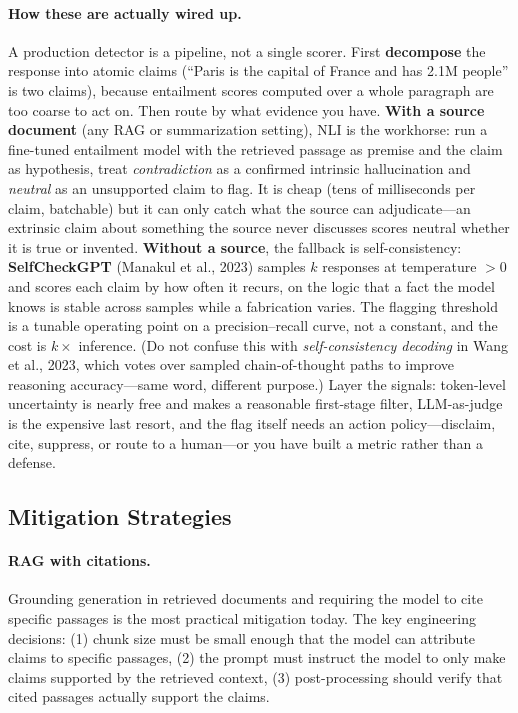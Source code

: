 \paragraph{How these are actually wired up.}
A production detector is a pipeline, not a single scorer.  First
\textbf{decompose} the response into atomic claims (``Paris is the capital of
France and has 2.1M people'' is two claims), because entailment scores computed
over a whole paragraph are too coarse to act on.  Then route by what evidence
you have.  \textbf{With a source document} (any RAG or summarization setting),
NLI is the workhorse: run a fine-tuned entailment model with the retrieved
passage as premise and the claim as hypothesis, treat \emph{contradiction} as a
confirmed intrinsic hallucination and \emph{neutral} as an unsupported claim to
flag.  It is cheap (tens of milliseconds per claim, batchable) but it can only
catch what the source can adjudicate---an extrinsic claim about something the
source never discusses scores neutral whether it is true or invented.
\textbf{Without a source}, the fallback is self-consistency:
\textbf{SelfCheckGPT} (Manakul et al., 2023) samples $k$ responses at
temperature $>0$ and scores each claim by how often it recurs, on the logic
that a fact the model knows is stable across samples while a fabrication varies.
The flagging threshold is a tunable operating point on a precision--recall
curve, not a constant, and the cost is $k\times$ inference.  (Do not confuse
this with \emph{self-consistency decoding} in Wang et al., 2023, which votes
over sampled chain-of-thought paths to improve reasoning accuracy---same word,
different purpose.)  Layer the signals: token-level uncertainty is nearly free
and makes a reasonable first-stage filter, LLM-as-judge is the expensive last
resort, and the flag itself needs an action policy---disclaim, cite, suppress,
or route to a human---or you have built a metric rather than a defense.

\subsection{Mitigation Strategies}

\paragraph{RAG with citations.}
Grounding generation in retrieved documents and requiring the model to cite
specific passages is the most practical mitigation today.  The key engineering
decisions: (1) chunk size must be small enough that the model can attribute
claims to specific passages, (2) the prompt must instruct the model to only
make claims supported by the retrieved context, (3) post-processing should
verify that cited passages actually support the claims.


